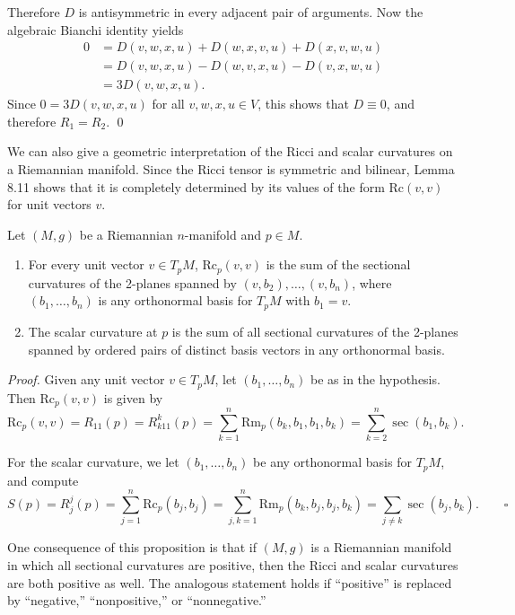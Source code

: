 Therefore $D$ is antisymmetric in every adjacent pair of arguments. Now the algebraic Bianchi identity yields
\begin{align*}
0 &= D(v,w,x,u) + D(w,x,v,u) + D(x,v,w,u)\\
&= D(v,w,x,u) - D(w,v,x,u) - D(v,x,w,u)\\
&= 3D(v,w,x,u).
\end{align*}
Since $0 = 3D(v,w,x,u)$ for all $v,w,x,u \in V$, this shows that $D \equiv 0$, and therefore $R_1 = R_2$. \qed

We can also give a geometric interpretation of the Ricci and scalar curvatures on a Riemannian manifold. Since the Ricci tensor is symmetric and bilinear, Lemma 8.11 shows that it is completely determined by its values of the form $\text{Rc}(v,v)$ for unit vectors $v$.

\begin{proposition}
\label{prop:geometric-interpretation-ricci-scalar-curvatures}

Let $(M, g)$ be a Riemannian $n$-manifold and $p \in M$.

\begin{enumerate}
\item[(a)] For every unit vector $v \in T_p M$, $\text{Rc}_p(v,v)$ is the sum of the sectional curvatures of the 2-planes spanned by $(v,b_2), \ldots, (v,b_n)$, where $(b_1, \ldots, b_n)$ is any orthonormal basis for $T_p M$ with $b_1 = v$.

\item[(b)] The scalar curvature at $p$ is the sum of all sectional curvatures of the 2-planes spanned by ordered pairs of distinct basis vectors in any orthonormal basis.
\end{enumerate}
\end{proposition}

\emph{Proof.} Given any unit vector $v \in T_p M$, let $(b_1, \ldots, b_n)$ be as in the hypothesis. Then $\text{Rc}_p(v,v)$ is given by
\[
\text{Rc}_p(v,v) = R_{11}(p) = R_{k11}^k(p) = \sum_{k=1}^n \text{Rm}_p(b_k, b_1, b_1, b_k) = \sum_{k=2}^n \sec(b_1, b_k).
\]

For the scalar curvature, we let $(b_1, \ldots, b_n)$ be any orthonormal basis for $T_p M$, and compute
\[
S(p) = R_j^j(p) = \sum_{j=1}^n \text{Rc}_p(b_j, b_j) = \sum_{j,k=1}^n \text{Rm}_p(b_k, b_j, b_j, b_k)
= \sum_{j \neq k} \sec(b_j, b_k). \qquad\square
\]

One consequence of this proposition is that if $(M, g)$ is a Riemannian manifold in which all sectional curvatures are positive, then the Ricci and scalar curvatures are both positive as well. The analogous statement holds if ``positive'' is replaced by ``negative,'' ``nonpositive,'' or ``nonnegative.''

